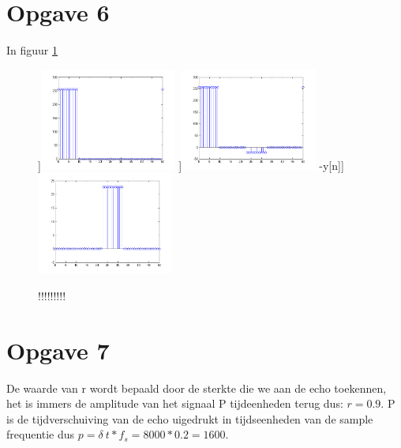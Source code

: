 \documentclass{article}
\begin{document}
\section{Opgave 6}
In figuur \ref{fig:opgave6}
\begin{figure}[h]
  \centering
 	\subfloat[][x[n]]{\includegraphics[width=0.4\textwidth]{content/6xx.png}}
	\subfloat[][y[n]]{\includegraphics[width=0.4\textwidth]{content/6yy.png}}
	\subfloat[][x[n]-y[n]]{\includegraphics[width=0.4\textwidth]{content/6.png}}
  \caption{!!!!!!!!!}
  \label{fig:opgave6}
\end{figure}

\section{Opgave 7}
De waarde van r wordt bepaald door de sterkte die we aan de echo toekennen, het is immers de amplitude van het signaal P tijdeenheden terug dus: $r = 0.9$. P is de tijdverschuiving van de echo uigedrukt in tijdseenheden van de sample frequentie dus $p = \delta~t*f_s = 8000 * 0.2 = 1600$.
\end{document}
